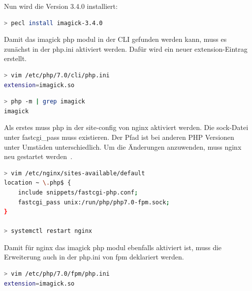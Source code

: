 Nun wird die Version 3.4.0 installiert:
\begin{lstlisting}[language=Bash, caption=PECL Install Imagick Modul,label={lst:peclinstallimagick}]
> pecl install imagick-3.4.0
\end{lstlisting}
\vspace{5mm}

Damit das imagick php modul in der CLI gefunden werden kann, muss es zunächst in der php.ini aktiviert werden.
Dafür wird ein neuer extension-Eintrag erstellt.

\begin{lstlisting}[language=Bash, caption=PHP Imagick aktivieren,label={lst:phpactivateimagick}]
> vim /etc/php/7.0/cli/php.ini
extension=imagick.so
\end{lstlisting}
\vspace{5mm}

\begin{lstlisting}[language=Bash, caption=PHP Überprüfe Imagick Modul,label={lst:phpcheckimagicksuccess}]
> php -m | grep imagick
imagick
\end{lstlisting}
\vspace{5mm}


Als erstes muss php in der site-config von nginx aktiviert werden. 
Die sock-Datei unter fastcgi\_pass muss existieren. 
Der Pfad ist bei anderen PHP Versionen unter Umstäden unterschiedlich. 
Um die Änderungen anzuwenden, muss nginx neu gestartet werden~\cite{InstallNginxPHP}.

\begin{lstlisting}[language=Bash, caption=NGINX Default-Config,label={lst:nginxdefaultconf}]
> vim /etc/nginx/sites-available/default
location ~ \.php$ {
    include snippets/fastcgi-php.conf;
    fastcgi_pass unix:/run/php/php7.0-fpm.sock;
}

> systemctl restart nginx
\end{lstlisting}
\vspace{5mm}


Damit für nginx das imagick php modul ebenfalls aktiviert ist, muss die Erweiterung auch in der php.ini von fpm deklariert werden.

\begin{lstlisting}[language=Bash, caption=PHP-FPM Imagick Modul aktivieren,label={lst:phpfpmaddimagick}]
> vim /etc/php/7.0/fpm/php.ini
extension=imagick.so
\end{lstlisting}
\vspace{5mm}

